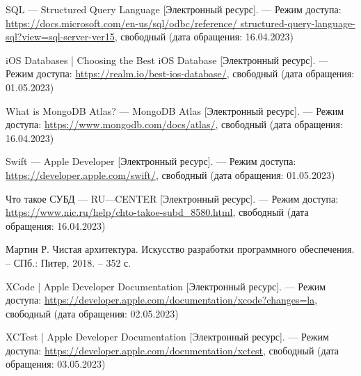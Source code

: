 \begin{thebibliography}{}
	SQL --- Structured Query Language  [Электронный ресурс]. --- Режим доступа: \url{https://docs.microsoft.com/en-us/sql/odbc/reference/ structured-query-language-sql?view=sql-server-ver15}, свободный (дата обращения: 16.04.2023)
	
	iOS Databases | Choosing the Best iOS Database  [Электронный ресурс]. --- Режим доступа: \url{https://realm.io/best-ios-database/}, свободный (дата обращения: 01.05.2023)
	
	What is MongoDB Atlas? --- MongoDB Atlas [Электронный ресурс]. --- Режим доступа: \url{https://www.mongodb.com/docs/atlas/}, свободный (дата обращения: 16.04.2023)
	
	Swift --- Apple Developer  [Электронный ресурс]. --- Режим доступа: \url{https://developer.apple.com/swift/}, свободный (дата обращения: 01.05.2023)
	
	Что такое СУБД --- RU---CENTER [Электронный ресурс]. --- Режим доступа: \url{https://www.nic.ru/help/chto-takoe-subd_8580.html}, свободный (дата обращения: 16.04.2023)
	
	Мартин Р. Чистая архитектура. Искусство разработки программного обеспечения. – СПб.: Питер, 2018. – 352 с.
	
	
	XCode | Apple Developer Documentation [Электронный ресурс]. --- Режим доступа: \url{https://developer.apple.com/documentation/xcode?changes=la}, свободный (дата обращения: 02.05.2023)
	
	XCTest | Apple Developer Documentation [Электронный ресурс]. --- Режим доступа: \url{https://developer.apple.com/documentation/xctest}, свободный (дата обращения: 03.05.2023)
	
	
	
	

	
	

\end{thebibliography}
